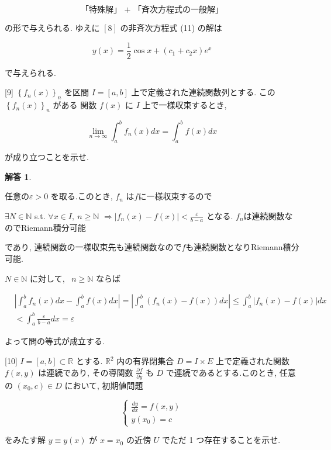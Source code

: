 \documentclass[10pt]{jsarticle}
\newtheorem*{answer*}{解答}
\begin{document}
$$
\text { 「特殊解」 }+ \text { 「斉次方程式の一般解」 }
$$

の形で与えられる. ゆえに $[8]$ の非斉次方程式 (11) の解は


\begin{equation*}
y(x)=\frac{1}{2} \cos x+\left(c_{1}+c_{2} x\right) e^{x} \tag{*3}
\end{equation*}


で与えられる.

\bigskip
\bigskip

\begin{itembox}[l]{[9]}
$\left\{f_{n}(x)\right\}_{n}$ を区間 $I=[a, b]$ 上で定義された連続関数列とする. この $\left\{f_{n}(x)\right\}_{n}$ がある 関数 $f(x)$ に $I$ 上で一様収束するとき,


\begin{equation*}
\lim _{n \rightarrow \infty} \int_{a}^{b} f_{n}(x) d x=\int_{a}^{b} f(x) d x \tag{12}
\end{equation*}


が成り立つことを示せ.  
\end{itembox}


\bigskip

\begin{answer*}
\end{answer*}

任意の$\varepsilon>0$ を取る.このとき, $f_n$ は$f$に一様収束するので

$\exists N \in \mathbb{N}$ s.t. $\forall x \in I, \ n \ge \mathbb{N}$ $\Rightarrow\left|f_{n}(x)-f(x)\right|< \displaystyle \frac{\varepsilon}{b-a}$
となる.
$f_n$は連続関数なのでRiemann積分可能

であり, 連続関数の一様収束先も連続関数なので$f$も連続関数となりRiemann積分可能.

$N \in \mathbb{N}$ に対して, \ $n \ge \mathbb{N}$ ならば

$$
\begin{aligned}
& \left|\int_{a}^{b} f_{n}(x) d x-\int_{a}^{b} f(x) d x\right|
=\left|\int_{a}^{b}\left(f_{n}(x)-f(x)\right) d x\right| 
\le \int_{a}^{b}\left|f_{n}(x)-f(x)\right| d x \\
& < \int_{a}^{b} \frac{\varepsilon}{b-a} d x
=\varepsilon
\end{aligned}
$$

よって問の等式が成立する.

\bigskip
\bigskip

\begin{itembox}[l]{[10]}
$I=[a, b] \subset \mathbb{R}$ とする. $\mathbb{R}^{2}$ 内の有界閉集合 $D=I \times E$ 上で定義された関数 $f(x, y)$ は連続であり, その導関数 $\frac{\partial f}{\partial y}$ も $D$ で連続であるとする.このとき, 任意の $\left(x_{0}, c\right) \in D$ において, 初期値問題

\[
\left\{\begin{array}{l}
\frac{d y}{d x}=f(x, y)  \tag{13}\\
y\left(x_{0}\right)=c
\end{array}\right.
\]

をみたす解 $y \equiv y(x)$ が $x=x_{0}$ の近傍 $U$ でただ 1 つ存在することを示せ.  
\end{itembox}
\end{document}
